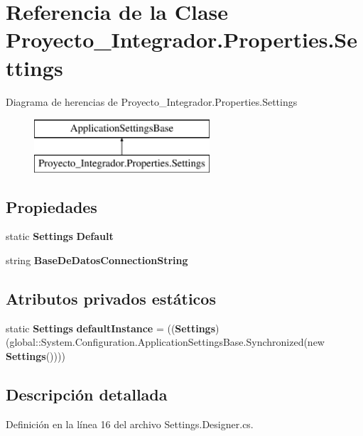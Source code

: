 \section{Referencia de la Clase Proyecto\-\_\-\-Integrador.\-Properties.\-Settings}
\label{class_proyecto___integrador_1_1_properties_1_1_settings}
Diagrama de herencias de Proyecto\-\_\-\-Integrador.\-Properties.\-Settings\begin{figure}[H]
\begin{center}
\leavevmode
\includegraphics[height=2.000000cm]{class_proyecto___integrador_1_1_properties_1_1_settings}
\end{center}
\end{figure}
\subsection*{Propiedades}
\begin{DoxyCompactItemize}
\item 
static {\bf Settings} {\bf Default}\hspace{0.3cm}{\ttfamily  [get]}
\item 
string {\bf Base\-De\-Datos\-Connection\-String}\hspace{0.3cm}{\ttfamily  [get]}
\end{DoxyCompactItemize}
\subsection*{Atributos privados estáticos}
\begin{DoxyCompactItemize}
\item 
static {\bf Settings} {\bf default\-Instance} = (({\bf Settings})(global\-::\-System.\-Configuration.\-Application\-Settings\-Base.\-Synchronized(new {\bf Settings}())))
\end{DoxyCompactItemize}


\subsection{Descripción detallada}


Definición en la línea 16 del archivo Settings.\-Designer.\-cs.



